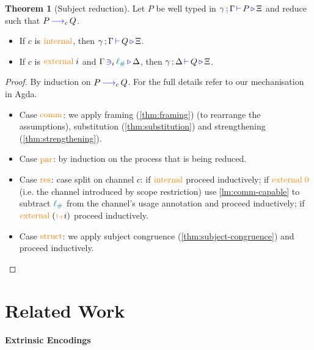 \documentclass[sigplan,10pt,anonymous,review]{acmart}
\theoremstyle{definition}
\newtheorem{nitheorem}{Theorem}
\newcommand{\type}[1]{\textcolor{blue}{\operatorname{#1}}}
\newcommand{\constr}[1]{\textcolor{orange}{\operatorname{#1}}}
\newcommand{\func}[1]{\textcolor{teal}{\operatorname{#1}}}
\newcommand{\suc}{\constr{\scriptstyle 1+}}
\newcommand{\lio}{\func{\ell_{\#}}}
\newcommand{\reduce}[1]{\, \type{\longrightarrow}_{#1} \,}
\newcommand{\types}[4]{#1 \, \type{;} \, #2 \, \type{\vdash} \, #3 \, \type{\triangleright} \, #4}
\newcommand{\containsusage}[4]{#1 \, \type{\ni}_{#2} \, #3 \, \type{\triangleright} \, #4}
\begin{document}
\begin{nitheorem}[Subject reduction]
  \label{thm:subject-reduction}
  Let $P$ be well typed in $\types{\gamma}{\Gamma}{P}{\Xi}$ and reduce such that $P \reduce{c} Q$.
  \begin{itemize}
    \item If $c$ is $\constr{internal}$, then $\types{\gamma}{\Gamma}{Q}{\Xi}$.
    \item If $c$ is $\constr{external} \; i$ and $\containsusage{\Gamma}{i}{\lio}{\Delta}$, then $\types{\gamma}{\Delta}{Q}{\Xi}$.
  \end{itemize}
\end{nitheorem}

\begin{proof}[Proof]
  By induction on $P \reduce{c} Q$. For the full details refer to our mechanisation in Agda.  
  \begin{itemize}
    \item
    Case $\constr{comm}$: we apply framing (\autoref{thm:framing}) (to rearrange the assumptions), substitution (\autoref{thm:substitution}) and strengthening (\autoref{thm:strengthening}).
  
    \item
    Case $\constr{par}$: by induction on the process that is being reduced.

    \item
    Case $\constr{res}$: case split on channel $c$:
    if $\constr{internal}$ proceed inductively;
    if $\constr{external}\; \constr{0}$ (i.e. the channel introduced by scope restriction) use \autoref{lm:comm-capable} to subtract $\lio$ from the channel's usage annotation and proceed inductively;
    if $\constr{external}\; (\suc i)$ proceed inductively.

    \item
    Case $\constr{struct}$: we apply subject congruence (\autoref{thm:subject-congruence}) and proceed inductively. \qedhere
  \end{itemize}
\end{proof}

\section{Related Work}

\paragraph{Extrinsic Encodings}
\end{document}

